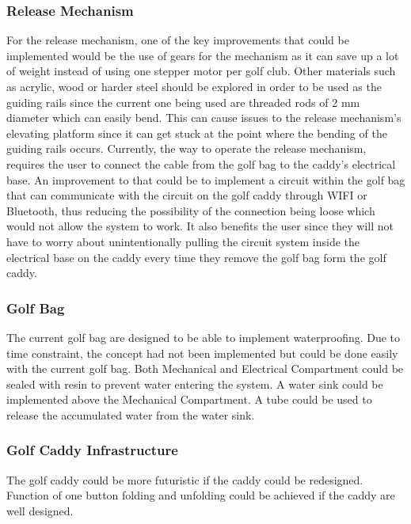 \documentclass[11pt,landscape]{article}
\begin{document}
\begin{multicols}{2}
    \subsubsection{Release Mechanism}
    For the release mechanism, one of the key improvements that could be
    implemented would be the use of gears for the mechanism as it can save up a
    lot of weight instead of using one stepper motor per golf club. Other
    materials such as acrylic, wood or harder steel should be explored in order
    to be used as the guiding rails since the current one being used are
    threaded rods of 2 mm diameter which can easily bend. This can cause issues
    to the release mechanism’s elevating platform since it can get stuck at the
    point where the bending of the guiding rails occurs. Currently, the way to
    operate the release mechanism, requires the user to connect the cable from
    the golf bag to the caddy’s electrical base. An improvement to that could be
    to implement a circuit within the golf bag that can communicate with the
    circuit on the golf caddy through WIFI or Bluetooth, thus reducing the
    possibility of the connection being loose which would not allow the system
    to work. It also benefits the user since they will not have to worry about
    unintentionally pulling the circuit system inside the electrical base on the
    caddy every time they remove the golf bag form the golf caddy. 
    
    \subsubsection{Golf Bag}
    The current golf bag are designed to be able to implement waterproofing. Due
    to time constraint, the concept had not been implemented but could be done
    easily with the current golf bag. Both Mechanical and Electrical Compartment
    could be sealed with resin to prevent water entering the system. A water
    sink could be implemented above the Mechanical Compartment. A tube could be
    used to release the accumulated water from the water sink.
    
    \subsubsection{Golf Caddy Infrastructure}
    The golf caddy could be more futuristic if the caddy could be redesigned.
    Function of one button folding and unfolding could be achieved if the caddy
    are well designed.
    

\end{multicols}
\end{document}
